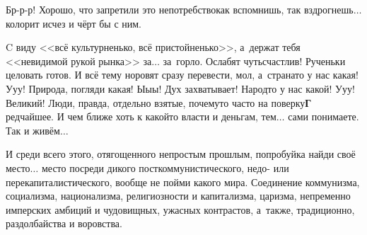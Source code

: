 Бр-р-р! Хорошо, что запретили это непотребство\mdash как вспомнишь, так вздрогнешь$\ldots$ колорит исчез и чёрт бы с ним.



C виду <<всё культурненько, всё пристойненько>>, а~держат тебя <<невидимой рукой рынка>> за$\ldots$ за~горло. Ослабят чуть\mdash счастлив! Рученьки целовать готов. 
И всё тему норовят сразу перевести, мол, а~страна\sdash то у нас какая! У\sdash у\sdash у! Природа, погляди какая! Ы\sdash ы\sdash ы! Дух захватывает! Народ\sdash то у нас какой! У\sdash у\sdash у! Великий! Люди, правда, отдельно взятые, почему\sdash то часто на поверку\mdash \textbf{Г} редчайшее. И чем ближе хоть к какой\sdash то власти и деньгам, тем$\ldots$ сами понимаете. Так и живём$\ldots$

И среди всего этого, отягощенного непростым прошлым, попробуй\sdash ка найди своё место$\ldots$ место посреди дикого посткоммунистического, недо- или пере\sdash  капиталистического, вообще не пойми какого мира. 
Соединение коммунизма, социализма, национализма, религиозности и капитализма, царизма, непременно имперских амбиций и чудовищных, ужасных контрастов, а~также, традиционно, раздолбайства и воровства. 

